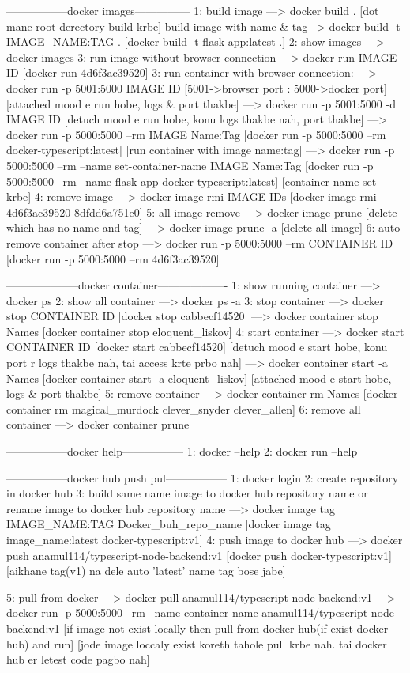 -----------------docker images---------------
1: build image ---> docker build . [dot mane root derectory build krbe]
    build image with name & tag --> docker build -t IMAGE_NAME:TAG . [docker build -t flask-app:latest .]
2: show images ---> docker images
3: run image without browser connection ---> docker run IMAGE ID [docker run 4d6f3ac39520]
3: run container with browser connection:
---> docker run -p 5001:5000 IMAGE ID [5001->browser port : 5000->docker port] [attached mood e run hobe, logs & port thakbe]
---> docker run -p 5001:5000 -d IMAGE ID [detuch mood e run hobe, konu logs thakbe nah, port thakbe]
---> docker run -p 5000:5000 --rm IMAGE Name:Tag [docker run -p 5000:5000 --rm docker-typescript:latest] [run container with image name:tag]
---> docker run -p 5000:5000 --rm --name set-container-name IMAGE Name:Tag [docker run -p 5000:5000 --rm --name flask-app docker-typescript:latest] [container name set krbe]
4: remove image ---> docker image rmi IMAGE IDs [docker image rmi 4d6f3ac39520 8dfdd6a751e0]
5: all image remove 
---> docker image prune [delete which has no name and tag]
---> docker image prune -a [delete all image]
6: auto remove container after stop 
---> docker run -p 5000:5000 --rm CONTAINER ID [docker run -p 5000:5000 --rm 4d6f3ac39520]



--------------------docker container-------------------
1: show running container ---> docker ps
2: show all container ---> docker ps -a
3: stop container 
---> docker stop CONTAINER ID [docker stop cabbecf14520]
---> docker container stop Names [docker container stop eloquent_liskov]
4: start container 
---> docker start CONTAINER ID [docker start cabbecf14520] [detuch mood e start hobe, konu port r logs thakbe nah, tai access krte prbo nah]
---> docker container start -a Names [docker container start -a eloquent_liskov] [attached mood e start hobe, logs & port thakbe]
5: remove container 
---> docker container rm Names [docker container rm magical_murdock clever_snyder clever_allen]
6: remove all container
---> docker container prune

-----------------docker help-----------------
1: docker --help
2: docker run --help


-----------------docker hub push pul-----------------
1: docker login
2: create repository in docker hub
3: build same name image to docker hub repository name
 or rename image to docker hub repository name ---> docker image tag IMAGE_NAME:TAG Docker_buh_repo_name [docker image tag image_name:latest  docker-typescript:v1]
4: push image to docker hub ---> docker push anamul114/typescript-node-backend:v1 [docker push docker-typescript:v1] [aikhane tag(v1) na dele auto 'latest' name tag bose jabe]

5: pull from docker
---> docker pull anamul114/typescript-node-backend:v1 
---> docker run -p 5000:5000 --rm --name container-name anamul114/typescript-node-backend:v1 [if image not exist locally then pull from docker hub(if exist docker hub) and run] [jode image loccaly exist koreth tahole pull krbe nah. tai docker hub er letest code pagbo nah]